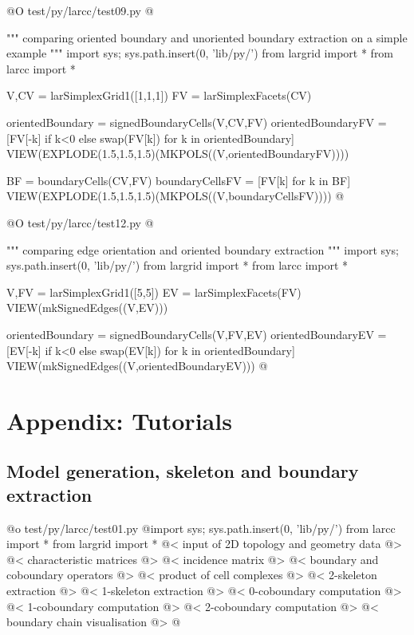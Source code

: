 \documentclass[11pt,oneside]{article}	%
\begin{document}
@O test/py/larcc/test09.py
@{""" comparing oriented boundary and unoriented boundary extraction on a simple example """
import sys; sys.path.insert(0, 'lib/py/')
from largrid import *
from larcc import *

V,CV = larSimplexGrid1([1,1,1])
FV = larSimplexFacets(CV)

orientedBoundary = signedBoundaryCells(V,CV,FV)
orientedBoundaryFV = [FV[-k] if k<0 else swap(FV[k]) for k in orientedBoundary]
VIEW(EXPLODE(1.5,1.5,1.5)(MKPOLS((V,orientedBoundaryFV))))

BF = boundaryCells(CV,FV)
boundaryCellsFV = [FV[k] for k in BF]
VIEW(EXPLODE(1.5,1.5,1.5)(MKPOLS((V,boundaryCellsFV))))
@}

@O test/py/larcc/test12.py
@{""" comparing edge orientation and oriented boundary extraction """
import sys; sys.path.insert(0, 'lib/py/')
from largrid import *
from larcc import *

V,FV = larSimplexGrid1([5,5])
EV = larSimplexFacets(FV)
VIEW(mkSignedEdges((V,EV)))

orientedBoundary = signedBoundaryCells(V,FV,EV)
orientedBoundaryEV = [EV[-k] if k<0 else swap(EV[k]) for k in orientedBoundary]
VIEW(mkSignedEdges((V,orientedBoundaryEV)))
@}



\appendix

\section{Appendix: Tutorials}


\subsection{Model generation, skeleton and boundary extraction}

@o test/py/larcc/test01.py
@{import sys; sys.path.insert(0, 'lib/py/')
from larcc import *
from largrid import *
@< input of 2D topology and geometry data @>
@< characteristic matrices @>
@< incidence matrix @>
@< boundary and coboundary operators @>
@< product of cell complexes @>
@< 2-skeleton extraction @>
@< 1-skeleton extraction  @>
@< 0-coboundary computation @>
@< 1-coboundary computation @>
@< 2-coboundary computation @>
@< boundary chain visualisation @>
@}
\end{document}
